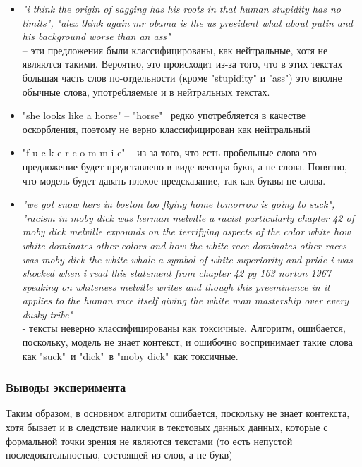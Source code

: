 \begin{itemize}
	\item {\itshape "i think the origin of sagging has his roots in that human stupidity has no limits"{}, "alex  think again  mr  obama is the us  president  what about putin and his background  worse than an ass"{}} \\-- эти предложения были классифицированы, как нейтральные, хотя не являются такими. Вероятно, это происходит из-за того, что в этих текстах большая часть слов по-отдельности (кроме "stupidity" и "ass") это вполне обычные слова, употребляемые и в нейтральных текстах. \\
	\item "she looks like a horse" {} -- {}"horse" \ редко употребляется в качестве оскорбления, поэтому не верно классифицирован как нейтральный 
	\item "f u c k e r c o m m i e"{} -- из-за того, что есть пробельные слова это предложение будет представлено в виде вектора букв, а не слова. Понятно, что модель будет давать плохое предсказание, так как буквы не слова.
	\item {\itshape "we got snow here in boston  too    flying home tomorrow is going to suck"{}, "racism in moby dick       was herman melville a racist   particularly chapter 42 of moby dick  melville expounds on the terrifying aspects of the color white  how white dominates other colors  and how the white race dominates other races   was moby dick  the white whale  a symbol of white superiority and pride   i was shocked when i read this statement from chapter 42 pg  163 norton   1967  speaking on whiteness  melville writes       and though this preeminence in it applies to the human race itself  giving the white man mastership over every dusky tribe"{}}\\- тексты неверно классифицированы как токсичные. Алгоритм, ошибается, поскольку,  модель не знает контекст, и ошибочно воспринимает такие слова как "suck"\  и "dick"\  в "moby dick"\  как токсичные.
\end{itemize}
\subsubsection{Выводы эксперимента}
Таким образом, в основном алгоритм ошибается, поскольку не знает контекста, хотя бывает и в следствие наличия в текстовых данных данных, которые с формальной точки зрения не являются текстами (то есть непустой последовательностью, состоящей из слов, а не букв)